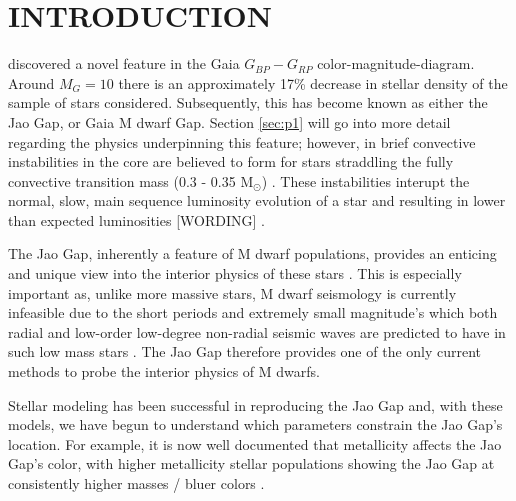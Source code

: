 \section{INTRODUCTION}\label{sec:intro}
\citet{Jao2018} discovered a novel feature in the Gaia $G_{BP}-G_{RP}$
color-magnitude-diagram. Around $M_{G}=10$ there is an approximately 17\%
decrease in stellar density of the sample of stars \citeauthor{Jao2018}
considered. Subsequently, this has become known as either the Jao Gap, or Gaia
M dwarf Gap. Section \ref{sec:p1} will go into more detail regarding the
physics underpinning this feature; however, in brief convective instabilities
in the core are believed to form for stars straddling the fully convective
transition mass (0.3 - 0.35 M$_{\odot}$) \citep{Baraffe2018}. These
instabilities interupt the normal, slow, main sequence luminosity evolution of
a star and resulting in lower than expected luminosities {\color{red} [WORDING]} \citep{Jao2020}.

The Jao Gap, inherently a feature of M dwarf populations, provides an enticing
and unique view into the interior physics of these stars \citep{Feiden2021}.
This is especially important as, unlike more massive stars, M dwarf seismology
is currently infeasible due to the short periods and extremely small
magnitude's which both radial and low-order low-degree non-radial seismic waves
are predicted to have in such low mass stars \citep{Rodriguez-Lopez2019}. The
Jao Gap therefore provides one of the only current methods to probe the
interior physics of M dwarfs.

Stellar modeling has been successful in reproducing the Jao Gap
\citep[e.g.][]{Feiden2021,Mansfield2021} and, with these models, we have begun
to understand which parameters constrain the Jao Gap's location. For example,
it is now well documented that metallicity affects the Jao Gap's color, with
higher metallicity stellar populations showing the Jao Gap at consistently
higher masses / bluer colors \citep{Mansfield2021}.

